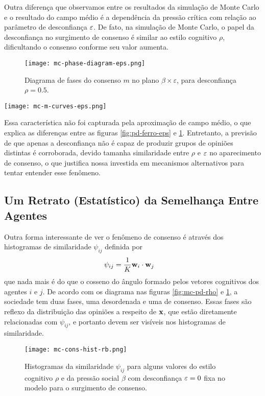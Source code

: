 Outra diferença que observamos entre os resultados da simulação de Monte Carlo e o resultado do campo médio é a dependência da pressão crítica com relação ao parâmetro de desconfiança $\varepsilon$.
De fato, na simulação de Monte Carlo, o papel da desconfiança no surgimento de consenso é similar ao estilo cognitivo $\rho$, dificultando o consenso conforme seu valor aumenta.
\begin{figure}[h!]\label{fig:mc-pd-eps}
    \centering    \texttt{[image: mc-phase-diagram-eps.png]}
    \caption{Diagrama de fases do consenso $m$ no plano $\beta \times   \varepsilon$, para desconfiança $\rho = 0.5$.}
\end{figure}
\begin{marginfigure}[-8cm]
    \texttt{[image: mc-m-curves-eps.png]}
    \caption{Curvas de consenso correspondentes às retas verticais na figura \ref{fig:mc-pd-eps}.}
\end{marginfigure}
Essa característica não foi capturada pela aproximação de campo médio, o que explica as diferenças entre as figuras \ref{fig:pd-ferro-eps} e \ref{fig:mc-pd-eps}.
Entretanto, a previsão de que apenas a desconfiança não é capaz de produzir grupos de opiniões distintas é corroborada, devido tamanha similaridade entre $\rho$ e $\varepsilon$ no aparecimento de consenso, o que justifica nossa investida em mecanismos alternativos para tentar entender esse fenômeno.

\subsection{Um Retrato (Estatístico) da Semelhança Entre Agentes}

Outra forma interessante de ver o fenômeno de consenso é através dos histogramas de similaridade $\psi_{ij}$ definida por
\begin{align}
    \psi_{ij} & = \frac{1}{K} \agt{i}\cdot \agt{j} \label{eq:psi-ij}
\end{align}
que nada mais é do que o cosseno do ângulo formado pelos vetores cognitivos dos agentes $i$ e $j$.
De acordo com os diagrama nas figuras \ref{fig:mc-pd-rho} e \ref{fig:mc-pd-eps}, a sociedade tem duas fases, uma desordenada e uma de consenso.
Essas fases são reflexo da distribuição das opiniões a respeito de $\mathbf{x}$, que estão diretamente relacionadas com $\psi_{ij}$, e portanto devem ser visíveis nos histogramas de similaridade.

\begin{figure}[h!]\label{fig:mc-cons-hist-br}
    \centering
    \texttt{[image: mc-cons-hist-rb.png]}
    \caption{Histogramas da similaridade $\psi_{ij}$ para alguns valores do estilo cognitivo $\rho$ e da pressão social $\beta$ com desconfiança $\varepsilon=0$ fixa no modelo para o surgimento de consenso.}
\end{figure}

